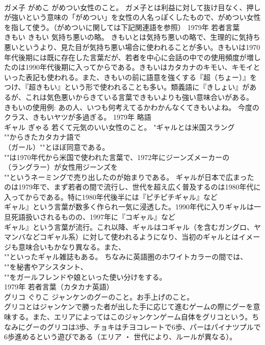 \documentclass[8pt]{extreport}
\begin{document}
\begin{CJK}{UTF8}{min}
\\	ガメ子	がめこ	がめつい女性のこと。	ガメ子とは利益に対して抜け目なく、押しが強いという意味の「がめつい」を女性の人名っぽくしたもので、がめつい女性を指して使う。（がめついに関しては下記関連語を参照）	1979年	若者言葉	
\\	きもい	きもい	気持ち悪いの略。	きもいとは気持ち悪いの略で、生理的に気持ち悪いというより、見た目が気持ち悪い場合に使われることが多い。きもいは1970年代後期には既に存在した言葉だが、若者を中心に会話の中での使用頻度が増したのは1990年代後期に入ってからである。きもいはカタカナのキモい、キモイといった表記も使われる。また、きもいの前に語意を強くする『超（ちょー）』をつけ、『超きもい』という形で使われることも多い。類義語に『きしょい』があるが、これは気色悪いからきている言葉できもいよりも強い意味合いがある。 きもいの使用例: あの人、いつも何考えてるかわかんなくてきもいよね。 今度のクラス、きもいヤツが多過ぎる。	1979年	略語	
\\	ギャル	ぎゃる	若くて元気のいい女性のこと。	"ギャルとは米国スラング
\\	""からきたカタカナ語で
\\	（ガール）""とほぼ同意である。
\\	""は1970年代から米国で使われた言葉で、1972年にジーンズメーカーの
\\	（ラングラー）が女性用ジーンズを
\\	""というネーミングで売り出したのが始まりである。 ギャルが日本で広まったのは1979年で、まず若者の間で流行し、世代を超え広く普及するのは1980年代に入ってからである。特に1980年代後半には『ピチピチギャル』など
\\	ギャル』という言葉が数多く作られ一気に浸透した。1990年代に入りギャルは一旦死語扱いされるものの、1997年に『コギャル』など
\\	ギャル』という言葉が流行。これ以降、ギャルはコギャル（を含むガングロ、ヤマンバなどコギャル系）に対して使われるようになり、当初のギャルとはイメージも意味合いもかなり異なる。また、
\\	""といったギャル雑誌もある。 ちなみに英語圏のホワイトカラーの間では、
\\	""を秘書やアシスタント、
\\	""をガールフレンドや娘といった使い分けをする。
\\	1979年	若者言葉（カタカナ英語）	
\\	グリコ	ぐりこ	ジャンケンのグーのこと。お手上げのこと。	
\\	グリコとはジャンケンで勝った者が出した手に応じて進むゲームの際にグーを意味する。また、エリアによってはこのジャンケンゲーム自体をグリコという。ちなみにグーのグリコは3歩、チョキはチヨコレートで6歩、パーはパイナツプルで6歩進めるという遊びである（エリア ・ 世代により、ルールが異なる）。 

\end{CJK}
\end{document}
